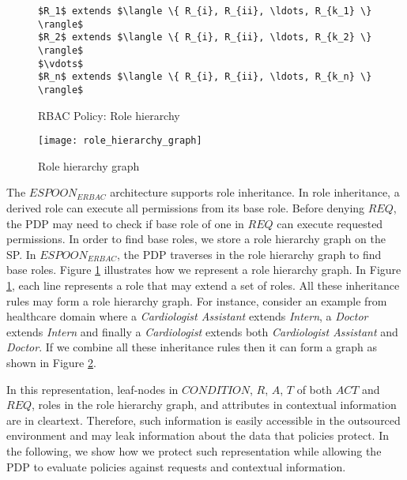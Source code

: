 \documentclass[final,5p,times,twocolumn]{elsarticle}
\newcommand{\Keywords}{\lstset{keywords={if,then,can,be,active,in,execute}}}
\begin{document}
\begin{figure}
\Keywords
\begin{lstlisting}[style=AMMA,numbers=none,breaklines,mathescape,rulesepcolor=\color{black}]
$R_1$ extends $\langle \{ R_{i}, R_{ii}, \ldots, R_{k_1} \} \rangle$
$R_2$ extends $\langle \{ R_{i}, R_{ii}, \ldots, R_{k_2} \} \rangle$
$\vdots$
$R_n$ extends $\langle \{ R_{i}, R_{ii}, \ldots, R_{k_n} \} \rangle$

\end{lstlisting}
\caption{RBAC Policy: Role hierarchy}
\label{fig:policy-role-hierarchy}
\end{figure}

\begin{figure}
\centering
\texttt{[image: role\_hierarchy\_graph]} \caption{Role hierarchy graph}
\label{fig:role_hierarchy_graph}
\end{figure}

The $\mathit{ESPOON_{ERBAC}}$ architecture supports role inheritance. In role inheritance, a derived role can execute all permissions from its base role. Before denying $\mathit{REQ}$, the PDP may need to check if base role of one in $\mathit{REQ}$ can execute requested permissions. In order to find base roles, we store a role hierarchy graph on the SP. In $\mathit{ESPOON_{ERBAC}}$, the PDP traverses in the role hierarchy graph to find base roles. Figure \ref{fig:policy-role-hierarchy} illustrates how we represent a role hierarchy graph. In Figure \ref{fig:policy-role-hierarchy}, each line represents a role that may extend a set of roles. All these inheritance rules may form a role hierarchy graph. For instance, consider an example from healthcare domain where a \emph{Cardiologist Assistant} extends \emph{Intern}, a \emph{Doctor} extends \emph{Intern} and finally a \emph{Cardiologist} extends both \emph{Cardiologist Assistant} and \emph{Doctor}. If we combine all these inheritance rules then it can form a graph as shown in Figure \ref{fig:role_hierarchy_graph}.

In this representation, leaf-nodes in $\mathit{CONDITION}$, $R$, $A$, $T$ of both $\mathit{ACT}$ and $\mathit{REQ}$, roles in the role hierarchy graph, and attributes in contextual information are in cleartext. Therefore, such information is easily accessible in the outsourced environment and may leak information about the data that policies protect. In the following, we show how we protect such representation while allowing the PDP to evaluate policies against requests and contextual information.
\end{document}
